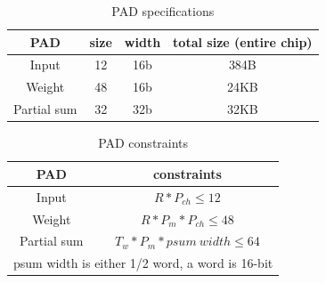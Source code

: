 \begin{table}[h] 
    \caption{PAD specifications}
    \label{tab:pad_spec}
    \centering
    \footnotesize 
        \begin{tabular}{c|ccc}
        \toprule
        PAD & size & width & total size (entire chip)\\
        \midrule
        Input &  12 & 16b & 384B\\
        Weight &  48 & 16b& 24KB\\
        Partial sum & 32 & 32b & 32KB\\
        \bottomrule
        \end{tabular}
\end{table}
\begin{table}[h]
    \caption{PAD constraints}
    \label{tab:pad_cons}
    \centering
    \footnotesize 
        \begin{tabular}{c|c}
        \toprule
        PAD &  constraints\\
        \midrule
        Input & $R*P_{ch} \leq 12$\\
        Weight & $R*P_m*P_{ch} \leq 48$\\
        Partial sum & $T_w*P_m*psum\ width \leq 64$ \\
        \bottomrule
        \multicolumn{2}{c}{psum width is either 1/2 word, a word is 16-bit}
        \end{tabular}
\end{table}


